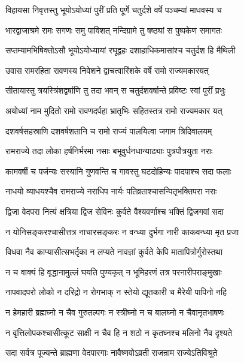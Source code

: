 \twolineshloka
{विहायसा निवृत्तस्तु भूयोऽयोध्यां पुरीं प्रति}
{पूर्णे चतुर्दशे वर्षे पञ्चम्यां माधवस्य च}%

\twolineshloka
{भारद्वाजाश्रमे रामः सगणः समु पाविशत्}
{नन्दिग्रामे तु षष्ठ्यां स पुष्पकेण समागतः}%

\twolineshloka
{सप्तम्यामभिषिक्तोऽसौ भूयोऽयोध्यायां रघूद्वहः}
{दशाहाधिकमासांश्च चतुर्दश हि मैथिली}%

\twolineshloka
{उवास रामरहिता रावणस्य निवेशने}
{द्वाचत्वारिंशके वर्षे रामो राज्यमकारयत्}%

\twolineshloka
{सीतायास्तु त्रयस्त्रिंशद्वर्षाणि तु तदा भवन्}
{स चतुर्दशवर्षान्ते प्रविष्टः स्वां पुरीं प्रभुः}%

\twolineshloka
{अयोध्यां नाम मुदितो रामो रावणदर्पहा}
{भ्रातृभिः सहितस्तत्र रामो राज्यमकार यत्}%

\twolineshloka
{दशवर्षसहस्राणि दशवर्षशतानि च}
{रामो राज्यं पालयित्वा जगाम त्रिदिवालयम्}%

\twolineshloka
{रामराज्ये तदा लोका हर्षनिर्भरमा नसाः}
{बभूवुर्धनधान्याढ्याः पुत्रपौत्रयुता नराः}%

\twolineshloka
{कामवर्षी च पर्जन्यः सस्यानि गुणवन्ति च}
{गावस्तु घटदोहिन्यः पादपाश्च सदा फलाः}%

\twolineshloka
{नाधयो व्याधयश्चैव रामराज्ये नराधिप}
{नार्यः पतिव्रताश्चासन्पितृभक्तिपरा नराः}%

\twolineshloka
{द्विजा वेदपरा नित्यं क्षत्रिया द्विज सेविनः}
{कुर्वते वैश्यवर्णाश्च भक्तिं द्विजगवां सदा}%

\twolineshloka
{न योनिसङ्करश्चासीत्तत्र नाचारसङ्करः}
{न वन्ध्या दुर्भगा नारी काकवन्ध्या मृत प्रजा}%

\twolineshloka
{विधवा नैव काप्यासीत्सभर्तृका न लप्यते}
{नावज्ञां कुर्वते केपि मातापित्रोर्गुरोस्तथा}%

\twolineshloka
{न च वाक्यं हि वृद्धानामुल्लं घयति पुण्यकृत्}
{न भूमिहरणं तत्र परनारीपराङ्मुखाः}%

\twolineshloka
{नापवादपरो लोको न दरिद्रो न रोगभाक्}
{न स्तेयो द्यूतकारी च मैरेयी पापिनो नहि}%

\twolineshloka
{न हेमहारी ब्रह्मघ्नो न चैव गुरुतल्पगः}
{न स्त्रीघ्नो न च बालघ्नो न चैवानृतभाषणः}%

\twolineshloka
{न वृत्तिलोपकश्चासीत्कूट साक्षी न चैव हि}
{न शठो न कृतघ्नश्च मलिनो नैव दृश्यते}%

\twolineshloka
{सदा सर्वत्र पूज्यन्ते ब्राह्मणा वेदपारगाः}
{नावैष्णवोऽव्रती राजन्राम राज्येऽतिविश्रुते}%


